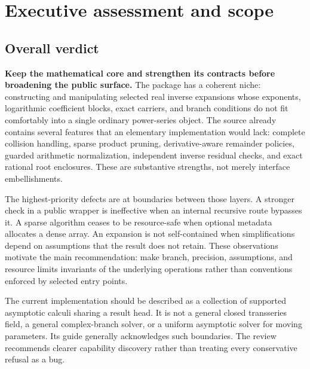 \documentclass[11pt,a4paper]{article}
\theoremstyle{remark}\newtheorem{remark}[proposition]{Remark}
\begin{document}
\section{Executive assessment and scope}
\subsection{Overall verdict}
\textbf{Keep the mathematical core and strengthen its contracts before broadening the public surface.} The package has a coherent niche: constructing and manipulating selected real inverse expansions whose exponents, logarithmic coefficient blocks, exact carriers, and branch conditions do not fit comfortably into a single ordinary power-series object. The source already contains several features that an elementary implementation would lack: complete collision handling, sparse product pruning, derivative-aware remainder policies, guarded arithmetic normalization, independent inverse residual checks, and exact rational root enclosures. These are substantive strengths, not merely interface embellishments.\cite{core,operations,arithmetic,incremental,certificates}

The highest-priority defects are at boundaries between those layers. A stronger check in a public wrapper is ineffective when an internal recursive route bypasses it. A sparse algorithm ceases to be resource-safe when optional metadata allocates a dense array. An expansion is not self-contained when simplifications depend on assumptions that the result does not retain. These observations motivate the main recommendation: make branch, precision, assumptions, and resource limits invariants of the underlying operations rather than conventions enforced by selected entry points.

The current implementation should be described as a collection of supported asymptotic calculi sharing a result head. It is not a general closed transseries field, a general complex-branch solver, or a uniform asymptotic solver for moving parameters. Its guide generally acknowledges such boundaries. The review recommends clearer capability discovery rather than treating every conservative refusal as a bug.\cite{guide,core,sourcecharts,inverseexpressions,native}
\end{document}
